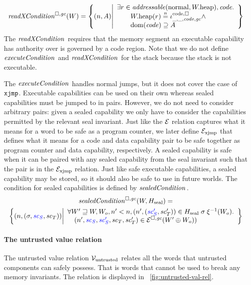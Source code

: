 \begin{jversion}
\[
  \xReadCond{W} = \left\{ \npair{A} \middle| 
    \begin{array}{l}
      \exists r \in \addressable{\normal, \pwheap}, \code \ldotp \\
      \qquad \pwheap(r) \nequal \codereg{\_,\_,\code,\gc}\wedge\\
      \qquad \dom(\code) \supseteq A 
    \end{array}
  \right\}
\]
The $\xReadCond[]{}$ requires that the memory segment an executable capability has authority over is governed by a code region.
Note that we do not define $\execCond[]{}$ and $\xReadCond[]{}$ for the stack because the stack is not executable.

The $\execCond[]{}$ handles normal jumps, but it does not cover the case of $\txjmp{}{}$.
Executable capabilities can be used on their own whereas sealed capabilities must be jumped to in pairs.
However, we do not need to consider arbitrary pairs: given a sealed capability we only have to consider the capabilities permitted by the relevant seal invariant.
Just like the $\mathcal{E}$ relation captures what it means for a word to be safe as a program counter, we later define $\mathcal{E}_{\mathrm{xjmp}}$ that defines what it means for a code and data capability pair to be safe together as program counter and data capability, respectively.
A sealed capability is safe when it can be paired with any sealed capability from the seal invariant such that the pair is in the $\mathcal{E}_{\mathrm{xjmp}}$ relation.
Just like safe executable capabilities, a sealed capability may be stored, so it should also be safe to use in future worlds.
The condition for sealed capabilities is defined by $\sealedCond[]{}$.
\begin{multline*}
\sealedCond{W,H_{\mathrm{seal}}} =\\
\left\{\npair{(\sigma, \src{\vsc_S},\vsc_T)}\middle|
  \begin{array}{l}
  \forall W' \future W, W_o, n' < n, \npair[n']{\stpair[.]{\vsc_S'}{\vsc'_T}} \in H_{\mathrm{seal}} \; \sigma \; \xi^{-1}(W_o) \ldotp\\
    \quad \npair[n']{\src{\vsc_S},\src{\vsc_S'},\vsc_T,\vsc_T'} \in \lrexj(W'\oplus W_o))
  \end{array}
\right\}
\end{multline*}

\paragraph{The untrusted value relation}
\label{par:untrusted-val-rel}
The untrusted value relation $\mathcal{V}_{\mathrm{untrusted}}$ relates all the words that untrusted components can safely possess.
That is words that cannot be used to break any memory invariants.
The relation is displayed in \figurename~\ref{fig:untrusted-val-rel}.


\end{jversion}
